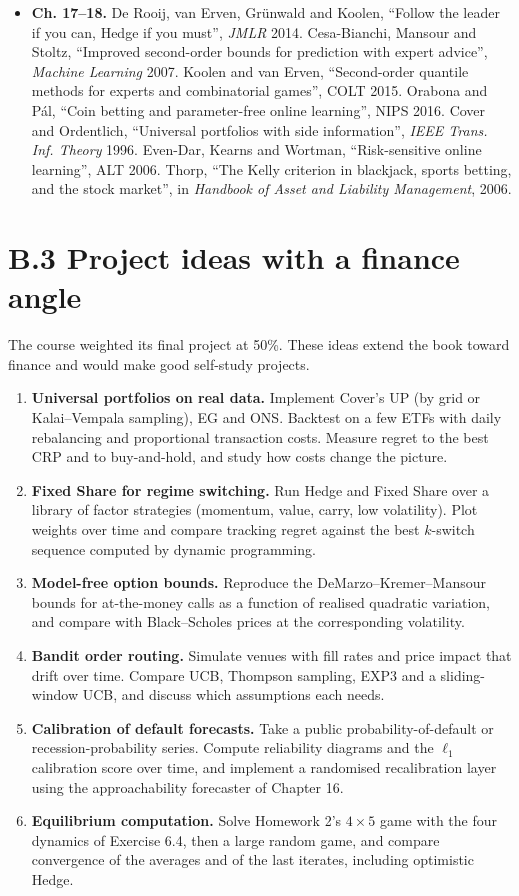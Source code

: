 \documentclass[11pt,a4paper,openany]{book}
\begin{document}
\begin{itemize}
\item \textbf{Ch. 17–18.} De Rooij, van Erven, Grünwald and Koolen, ``Follow the leader if you can, Hedge if you must'', \emph{JMLR} 2014. Cesa-Bianchi, Mansour and Stoltz, ``Improved second-order bounds for prediction with expert advice'', \emph{Machine Learning} 2007. Koolen and van Erven, ``Second-order quantile methods for experts and combinatorial games'', COLT 2015. Orabona and Pál, ``Coin betting and parameter-free online learning'', NIPS 2016. Cover and Ordentlich, ``Universal portfolios with side information'', \emph{IEEE Trans. Inf. Theory} 1996. Even-Dar, Kearns and Wortman, ``Risk-sensitive online learning'', ALT 2006. Thorp, ``The Kelly criterion in blackjack, sports betting, and the stock market'', in \emph{Handbook of Asset and Liability Management}, 2006.
\end{itemize}

\section*{B.3 Project ideas with a finance angle}\label{appB-projects}

The course weighted its final project at 50\%. These ideas extend the book toward finance and would make good self-study projects.

\begin{enumerate}
\item \textbf{Universal portfolios on real data.} Implement Cover's UP (by grid or Kalai–Vempala sampling), EG and ONS. Backtest on a few ETFs with daily rebalancing and proportional transaction costs. Measure regret to the best CRP and to buy-and-hold, and study how costs change the picture.
\item \textbf{Fixed Share for regime switching.} Run Hedge and Fixed Share over a library of factor strategies (momentum, value, carry, low volatility). Plot weights over time and compare tracking regret against the best $k$-switch sequence computed by dynamic programming.
\item \textbf{Model-free option bounds.} Reproduce the DeMarzo–Kremer–Mansour bounds for at-the-money calls as a function of realised quadratic variation, and compare with Black–Scholes prices at the corresponding volatility.
\item \textbf{Bandit order routing.} Simulate venues with fill rates and price impact that drift over time. Compare UCB, Thompson sampling, EXP3 and a sliding-window UCB, and discuss which assumptions each needs.
\item \textbf{Calibration of default forecasts.} Take a public probability-of-default or recession-probability series. Compute reliability diagrams and the $\ell_1$ calibration score over time, and implement a randomised recalibration layer using the approachability forecaster of Chapter 16.
\item \textbf{Equilibrium computation.} Solve Homework 2's $4\times5$ game with the four dynamics of Exercise 6.4, then a large random game, and compare convergence of the averages and of the last iterates, including optimistic Hedge.
\end{enumerate}
\end{document}

